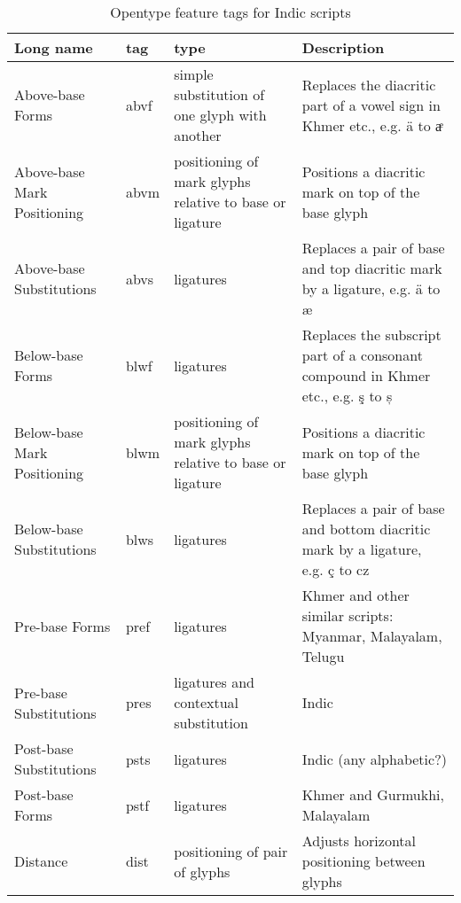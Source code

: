\begin{center}
\begin{longtable}{ | p{2cm} | p{1cm} | p{3cm} | p{5cm} |}
\caption{Opentype feature tags for Indic scripts}
\label{tab:otscripttagsindic} \\

\hline
Long name                   & tag  & type & Description                                                                          \\
\hline
Above-base Forms            & abvf & simple substitution of one glyph with another  & Replaces the diacritic part of a vowel sign in Khmer etc., e.g. ä to aͤ              \\ \hline
Above-base Mark Positioning & abvm & positioning of mark glyphs relative to base or ligature & Positions a diacritic mark on top of the base glyph                                  \\\hline
Above-base Substitutions    & abvs & ligatures   & Replaces a pair of base and top diacritic mark by a ligature, e.g. ä to æ            \\\hline
Below-base Forms            & blwf & ligatures   & Replaces the subscript part of a consonant compound in Khmer etc., e.g. ş to ș       \\\hline
Below-base Mark Positioning & blwm & positioning of mark glyphs relative to base or ligature & Positions a diacritic mark on top of the base glyph                                  \\\hline
Below-base Substitutions    & blws & ligatures  & Replaces a pair of base and bottom diacritic mark by a ligature, e.g. ç to cz        \\\hline
Pre-base Forms              & pref & ligatures   & Khmer and other similar scripts: Myanmar, Malayalam, Telugu                          \\\hline
Pre-base Substitutions      & pres & ligatures and contextual substitution & Indic                                                                                \\\hline
Post-base Substitutions     & psts & ligatures   & Indic (any alphabetic?)                                                              \\\hline
Post-base Forms             & pstf & ligatures   & Khmer and Gurmukhi, Malayalam                                                        \\\hline
Distance                    & dist & positioning of pair of glyphs  & Adjusts horizontal positioning between glyphs                                        \\\hline

\end{longtable}
\end{center}
